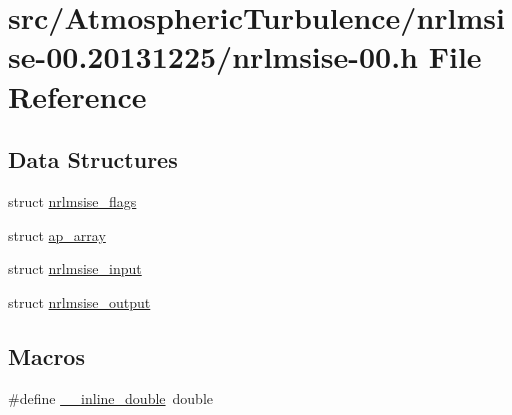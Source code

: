 \hypertarget{nrlmsise-00_8h}{\section{src/\+Atmospheric\+Turbulence/nrlmsise-\/00.20131225/nrlmsise-\/00.h File Reference}
\label{nrlmsise-00_8h}
}
\subsection*{Data Structures}
\begin{DoxyCompactItemize}
\item 
struct \hyperlink{structnrlmsise__flags}{nrlmsise\+\_\+flags}
\item 
struct \hyperlink{structap__array}{ap\+\_\+array}
\item 
struct \hyperlink{structnrlmsise__input}{nrlmsise\+\_\+input}
\item 
struct \hyperlink{structnrlmsise__output}{nrlmsise\+\_\+output}
\end{DoxyCompactItemize}
\subsection*{Macros}
\begin{DoxyCompactItemize}
\item 
\#define \hyperlink{nrlmsise-00_8h_ad38d2e3fa313d97ec413ff90989d9fdd}{\+\_\+\+\_\+inline\+\_\+double}~double
\end{DoxyCompactItemize}

